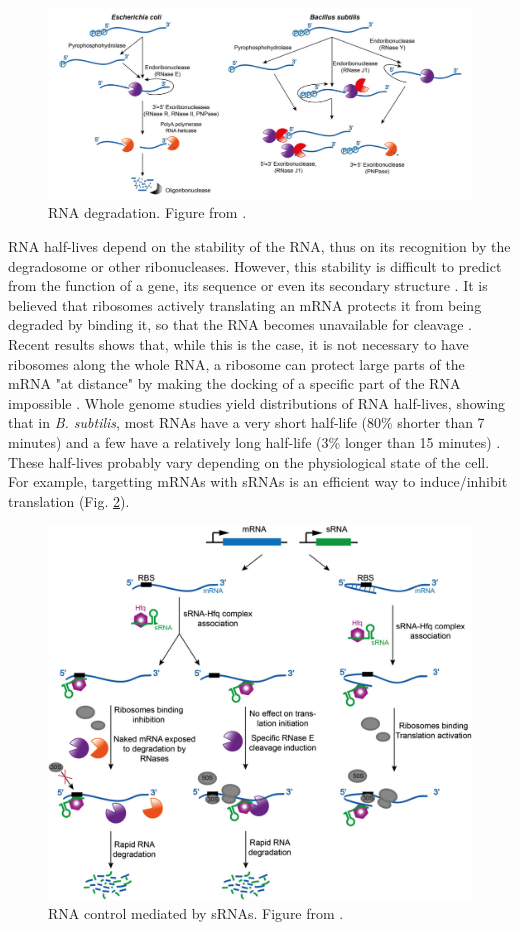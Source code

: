 \begin{figure}[!ht]
	\centering
	\includegraphics[width=0.9\linewidth]{figure/rnaDegradation}
	\caption{RNA degradation. Figure from \citet{bandyra_social_2013}.}
	\label{fig:rnaDegradation}
\end{figure}

RNA half-lives depend on the stability of the RNA, thus on its recognition by the degradosome or other ribonucleases. However, this stability is difficult to predict from the function of a gene, its sequence or even its secondary structure \citep{hambraeus_genome-wide_2003}. It is believed that ribosomes actively translating an mRNA protects it from being degraded by binding it, so that the RNA becomes unavailable for cleavage \citep{bandyra_licensing_2013}. Recent results shows that, while this is the case, it is not necessary to have ribosomes along the whole RNA, a ribosome can protect large parts of the mRNA "at distance" by making the docking of a specific part of the RNA impossible \citep{laalami_initiation_2013}. Whole genome studies yield distributions of RNA half-lives, showing that in \textit{B. subtilis}, most RNAs have a very short half-life (80\% shorter than 7 minutes) and a few have a relatively long half-life (3\% longer than 15 minutes) \citep{hambraeus_genome-wide_2003}. These half-lives probably vary depending on the physiological state of the cell. For example, targetting mRNAs with sRNAs is an efficient way to induce/inhibit translation (Fig. \ref{fig:srnaDegradation}).

\begin{figure}[!ht]
	\centering
	\includegraphics[width=0.9\linewidth]{figure/srnaDegradation}
	\caption{RNA control mediated by sRNAs. Figure from \citet{bandyra_social_2013}.}
	\label{fig:srnaDegradation}
\end{figure}